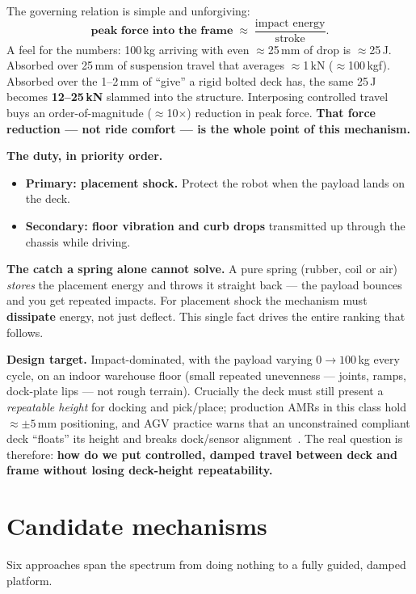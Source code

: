 \documentclass[11pt,a4paper]{article}
\begin{document}
The governing relation is simple and unforgiving:
\[
\textbf{peak force into the frame} \;\approx\; \frac{\text{impact energy}}{\text{stroke}}.
\]
A feel for the numbers: 100\,kg arriving with even $\approx$25\,mm of drop is $\approx$25\,J. Absorbed
over 25\,mm of suspension travel that averages $\approx$1\,kN ($\approx$100\,kgf). Absorbed over the
1--2\,mm of ``give'' a rigid bolted deck has, the same 25\,J becomes \textbf{12--25\,kN} slammed into the
structure. Interposing controlled travel buys an order-of-magnitude ($\approx$10$\times$) reduction in
peak force. \textbf{That force reduction --- not ride comfort --- is the whole point of this mechanism.}

\textbf{The duty, in priority order.}
\begin{itemize}
\item \textbf{Primary: placement shock.} Protect the robot when the payload lands on the deck.
\item \textbf{Secondary: floor vibration and curb drops} transmitted up through the chassis while driving.
\end{itemize}

\textbf{The catch a spring alone cannot solve.} A pure spring (rubber, coil or air) \emph{stores} the
placement energy and throws it straight back --- the payload bounces and you get repeated impacts. For
placement shock the mechanism must \textbf{dissipate} energy, not just deflect. This single fact drives
the entire ranking that follows.

\textbf{Design target.} Impact-dominated, with the payload varying $0\rightarrow100$\,kg every cycle, on
an indoor warehouse floor (small repeated unevenness --- joints, ramps, dock-plate lips --- not rough
terrain). Crucially the deck must still present a \emph{repeatable height} for docking and pick/place;
production AMRs in this class hold $\approx\pm5$\,mm positioning, and AGV practice warns that an
unconstrained compliant deck ``floats'' its height and breaks dock/sensor alignment~\cite{abb,casterhq}.
The real question is therefore: \textbf{how do we put controlled, damped travel between deck and frame
without losing deck-height repeatability.}

\section{Candidate mechanisms}
Six approaches span the spectrum from doing nothing to a fully guided, damped platform.
\end{document}
